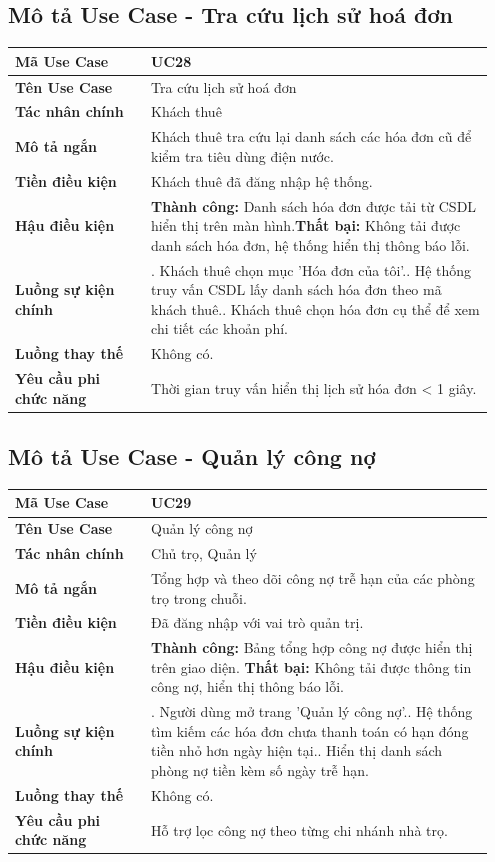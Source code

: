 \documentclass[a4paper,oneside]{report}
\begin{document}
\subsection{Mô tả Use Case - Tra cứu lịch sử hoá đơn}

\begin{longtable}[]{@{}>{\RaggedRight\arraybackslash}p{0.27\linewidth}>{\RaggedRight\arraybackslash}p{0.68\linewidth}@{}}
\toprule
\textbf{Mã Use Case} & UC28\tabularnewline
\midrule
\endhead
\textbf{Tên Use Case} & Tra cứu lịch sử hoá đơn\tabularnewline
\textbf{Tác nhân chính} & Khách thuê\tabularnewline
\textbf{Mô tả ngắn} & Khách thuê tra cứu lại danh sách các hóa đơn cũ để
kiểm tra tiêu dùng điện nước.\tabularnewline
\textbf{Tiền điều kiện} & Khách thuê đã đăng nhập hệ
thống.\tabularnewline
\textbf{Hậu điều kiện} & \textbf{Thành công:} Danh sách hóa đơn được tải từ CSDL hiển thị trên màn hình.\newline \textbf{Thất bại:} Không tải được danh sách hóa đơn, hệ thống hiển thị thông báo lỗi.\tabularnewline
\textbf{Luồng sự kiện chính} & 1. Khách thuê chọn mục
'Hóa đơn của tôi'.\newline 2. Hệ thống truy vấn CSDL lấy danh sách
hóa đơn theo mã khách thuê.\newline 3. Khách thuê chọn hóa đơn cụ
thể để xem chi tiết các khoản phí.\tabularnewline
\textbf{Luồng thay thế} & Không có.\tabularnewline
\textbf{Yêu cầu phi chức năng} & Thời gian truy vấn hiển thị lịch sử hóa
đơn \textless{} 1 giây.\tabularnewline
\bottomrule
\end{longtable}

\subsection{Mô tả Use Case - Quản lý công nợ}

\begin{longtable}[]{@{}>{\RaggedRight\arraybackslash}p{0.27\linewidth}>{\RaggedRight\arraybackslash}p{0.68\linewidth}@{}}
\toprule
\textbf{Mã Use Case} & UC29\tabularnewline
\midrule
\endhead
\textbf{Tên Use Case} & Quản lý công nợ\tabularnewline
\textbf{Tác nhân chính} & Chủ trọ, Quản lý\tabularnewline
\textbf{Mô tả ngắn} & Tổng hợp và theo dõi công nợ trễ hạn của các phòng
trọ trong chuỗi.\tabularnewline
\textbf{Tiền điều kiện} & Đã đăng nhập với vai trò quản
trị.\tabularnewline
\textbf{Hậu điều kiện} & \textbf{Thành công:} Bảng tổng hợp công nợ được hiển thị trên giao diện.\newline 
\textbf{Thất bại:} Không tải được thông tin công nợ, hiển thị thông báo lỗi.\tabularnewline
\textbf{Luồng sự kiện chính} & 1. Người dùng mở trang
'Quản lý công nợ'.\newline 2. Hệ thống tìm kiếm các hóa đơn chưa
thanh toán có hạn đóng tiền nhỏ hơn ngày hiện tại.\newline 3. Hiển
thị danh sách phòng nợ tiền kèm số ngày trễ hạn.\tabularnewline
\textbf{Luồng thay thế} & Không có.\tabularnewline
\textbf{Yêu cầu phi chức năng} & Hỗ trợ lọc công nợ theo từng chi nhánh
nhà trọ.\tabularnewline
\bottomrule
\end{longtable}
\end{document}
